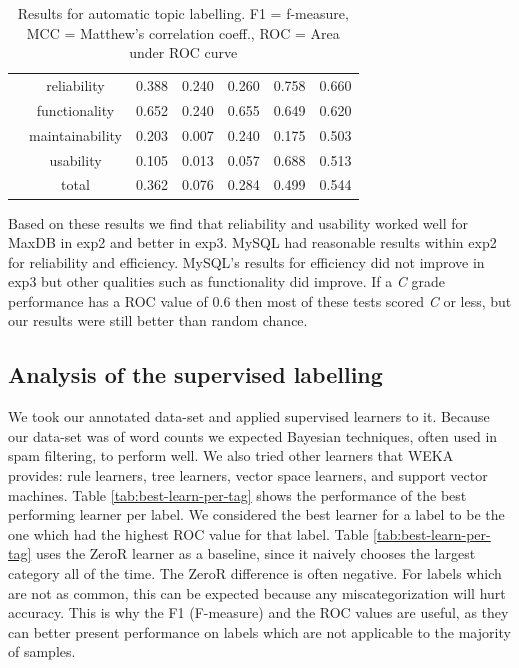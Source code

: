 \documentclass{acm_proc_article-sp}
\begin{document}
\begin{table}[h]
\begin{tabular}{c|c|c|c|c|c|c}
 & reliability & 0.388 & 0.240 & 0.260 & 0.758 & 0.660 \\ 
 & functionality & 0.652 & 0.240 & 0.655 & 0.649 & 0.620 \\ 
 & maintainability & 0.203 & 0.007 & 0.240 & 0.175 & 0.503 \\ 
 & usability & 0.105 & 0.013 & 0.057 & 0.688 & 0.513 \\ 
 & total & 0.362 & 0.076 & 0.284 & 0.499 & 0.544 \\
\bottomrule
\end{tabular}
	\caption{Results for automatic topic labelling. F1 = f-measure, MCC = Matthew's correlation coeff., ROC = Area under ROC curve}
	\label{tbl:maxdb-unsup-results}
\end{table}

Based on these results we find that reliability and usability worked well for MaxDB in \textsf{exp2} and better in \textsf{exp3}. MySQL had reasonable results within \textsf{exp2} for reliability and efficiency. MySQL's results for efficiency did not improve in \textsf{exp3} but other qualities such as functionality did improve. If a \emph{C} grade performance has a ROC value of $0.6$ then most of these tests scored \emph{C} or less, but our results were still better than random chance.

\subsection{Analysis of the supervised labelling}
\label{sec:suplabelling}

We took our annotated data-set and applied supervised learners to it. Because our data-set was of word counts we expected Bayesian techniques, often used in spam filtering, to perform well. We also tried other learners that WEKA~\cite{weka09} provides: rule learners, tree learners, vector space learners, and support vector machines.  Table \ref{tab:best-learn-per-tag} shows the performance of the best performing learner per label.  We considered the best learner for a label to be the one which had the highest ROC value for that label. Table \ref{tab:best-learn-per-tag} uses the ZeroR learner as a baseline, since it naively chooses the largest category all of the time. The ZeroR difference is often negative. For labels which are not as common, this can be expected because any miscategorization will hurt accuracy. This is why the F1 (F-measure) and the ROC values are useful, as they can better present performance on labels which are not applicable to the majority of samples.
\end{document}
